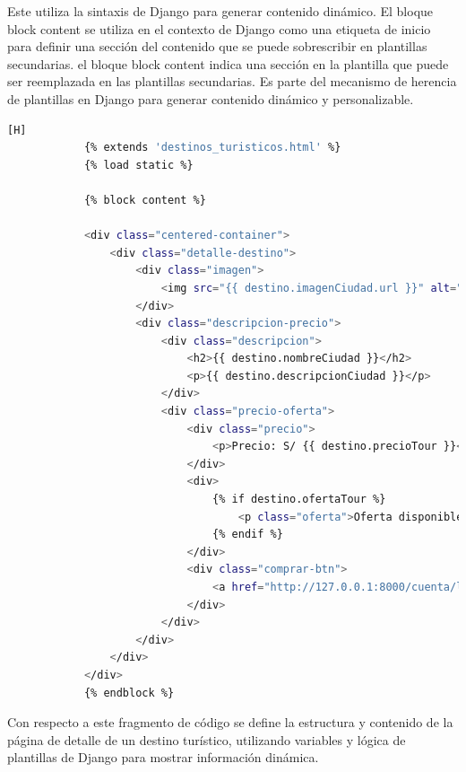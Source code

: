 \documentclass{article}
\begin{document}
         Este utiliza la sintaxis de Django para generar contenido dinámico. El bloque block content  se utiliza en el contexto de Django como una etiqueta de inicio para definir una sección del contenido que se puede sobrescribir en plantillas secundarias.
         el bloque { block content } indica una sección en la plantilla que puede ser reemplazada en las plantillas secundarias. Es parte del mecanismo de herencia de plantillas en Django para generar contenido dinámico y personalizable.

        \begin{lstlisting}[language=bash,caption={detalle\_destino.html}][H]
            {% extends 'destinos_turisticos.html' %}
            {% load static %}
            
            {% block content %}
            
            <div class="centered-container">
                <div class="detalle-destino">
                    <div class="imagen">
                        <img src="{{ destino.imagenCiudad.url }}" alt="{{ destino.nombreCiudad }}" class="imagen-ciudad">
                    </div>
                    <div class="descripcion-precio">
                        <div class="descripcion">
                            <h2>{{ destino.nombreCiudad }}</h2>
                            <p>{{ destino.descripcionCiudad }}</p>
                        </div>
                        <div class="precio-oferta">
                            <div class="precio">
                                <p>Precio: S/ {{ destino.precioTour }}</p>
                            </div>
                            <div>
                                {% if destino.ofertaTour %}
                                    <p class="oferta">Oferta disponible</p>
                                {% endif %}
                            </div>
                            <div class="comprar-btn">
                                <a href="http://127.0.0.1:8000/cuenta/login" class="comprar-btn">COMPRAR</a>
                            </div>
                        </div>
                    </div>
                </div>
            </div>
            {% endblock %}
	\end{lstlisting}
         Con respecto a este fragmento de código se define la estructura y contenido de la página de detalle de un destino turístico, utilizando variables y lógica de plantillas de Django para mostrar información dinámica.
\end{document}
